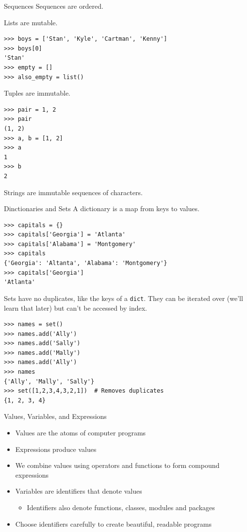\documentclass[smaller, aspectratio=1610]{beamer}
\begin{document}
\begin{frame}[label={sec:orgaeb281a},fragile]{Sequences}
 Sequences are ordered.

Lists are mutable.

\lstset{language=Python,label= ,caption= ,captionpos=b,numbers=none}
\begin{lstlisting}
>>> boys = ['Stan', 'Kyle', 'Cartman', 'Kenny']
>>> boys[0]
'Stan'
>>> empty = []
>>> also_empty = list()
\end{lstlisting}

Tuples are immutable.

\lstset{language=Python,label= ,caption= ,captionpos=b,numbers=none}
\begin{lstlisting}
>>> pair = 1, 2
>>> pair
(1, 2)
>>> a, b = [1, 2]
>>> a
1
>>> b
2
\end{lstlisting}

Strings are immutable sequences of characters.
\end{frame}


\begin{frame}[label={sec:org3461915},fragile]{Dinctionaries and Sets}
 A dictionary is a map from keys to values.

\lstset{language=Python,label= ,caption= ,captionpos=b,numbers=none}
\begin{lstlisting}
>>> capitals = {}
>>> capitals['Georgia'] = 'Atlanta'
>>> capitals['Alabama'] = 'Montgomery'
>>> capitals
{'Georgia': 'Altanta', 'Alabama': 'Montgomery'}
>>> capitals['Georgia']
'Atlanta'
\end{lstlisting}

Sets have no duplicates, like the keys of a \texttt{dict}. They can be iterated over (we'll learn that later) but can't be accessed by index.

\lstset{language=Python,label= ,caption= ,captionpos=b,numbers=none}
\begin{lstlisting}
>>> names = set()
>>> names.add('Ally')
>>> names.add('Sally')
>>> names.add('Mally')
>>> names.add('Ally')
>>> names
{'Ally', 'Mally', 'Sally'}
>>> set([1,2,3,4,3,2,1])  # Removes duplicates
{1, 2, 3, 4}
\end{lstlisting}
\end{frame}


\begin{frame}[label={sec:org5b63a94}]{Values, Variables, and Expressions}
\begin{itemize}
\item Values are the atoms of computer programs
\item Expressions produce values
\item We combine values using operators and functions to form compound expressions
\item Variables are identifiers that denote values
\begin{itemize}
\item Identifiers also denote functions, classes, modules and packages
\end{itemize}
\item Choose identifiers carefully to create beautiful, readable programs
\end{itemize}
\end{frame}
\end{document}
